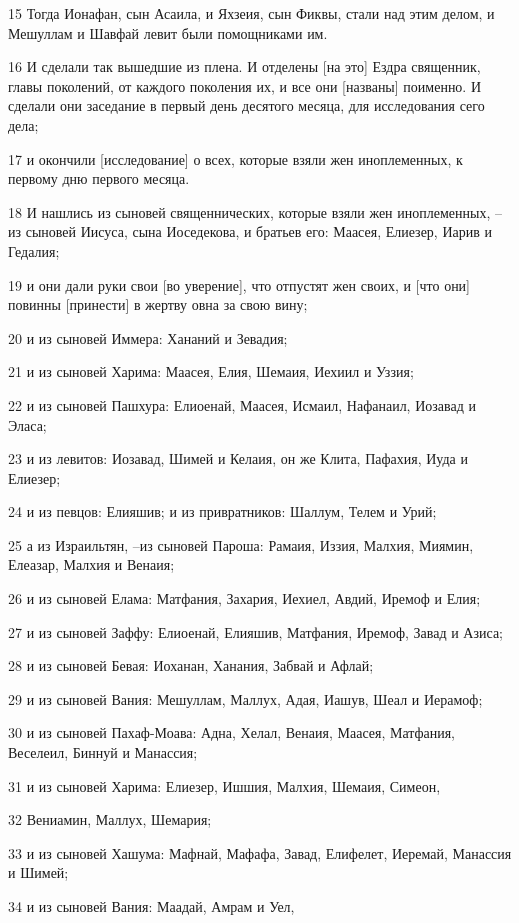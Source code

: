 \par 15 Тогда Ионафан, сын Асаила, и Яхзеия, сын Фиквы, стали над этим делом, и Мешуллам и Шавфай левит были помощниками им.
\par 16 И сделали так вышедшие из плена. И отделены [на это] Ездра священник, главы поколений, от каждого поколения их, и все они [названы] поименно. И сделали они заседание в первый день десятого месяца, для исследования сего дела;
\par 17 и окончили [исследование] о всех, которые взяли жен иноплеменных, к первому дню первого месяца.
\par 18 И нашлись из сыновей священнических, которые взяли жен иноплеменных, --из сыновей Иисуса, сына Иоседекова, и братьев его: Маасея, Елиезер, Иарив и Гедалия;
\par 19 и они дали руки свои [во уверение], что отпустят жен своих, и [что они] повинны [принести] в жертву овна за свою вину;
\par 20 и из сыновей Иммера: Хананий и Зевадия;
\par 21 и из сыновей Харима: Маасея, Елия, Шемаия, Иехиил и Уззия;
\par 22 и из сыновей Пашхура: Елиоенай, Маасея, Исмаил, Нафанаил, Иозавад и Эласа;
\par 23 и из левитов: Иозавад, Шимей и Келаия, он же Клита, Пафахия, Иуда и Елиезер;
\par 24 и из певцов: Елияшив; и из привратников: Шаллум, Телем и Урий;
\par 25 а из Израильтян, --из сыновей Пароша: Рамаия, Иззия, Малхия, Миямин, Елеазар, Малхия и Венаия;
\par 26 и из сыновей Елама: Матфания, Захария, Иехиел, Авдий, Иремоф и Елия;
\par 27 и из сыновей Заффу: Елиоенай, Елияшив, Матфания, Иремоф, Завад и Азиса;
\par 28 и из сыновей Бевая: Иоханан, Ханания, Забвай и Афлай;
\par 29 и из сыновей Вания: Мешуллам, Маллух, Адая, Иашув, Шеал и Иерамоф;
\par 30 и из сыновей Пахаф-Моава: Адна, Хелал, Венаия, Маасея, Матфания, Веселеил, Биннуй и Манассия;
\par 31 и из сыновей Харима: Елиезер, Ишшия, Малхия, Шемаия, Симеон,
\par 32 Вениамин, Маллух, Шемария;
\par 33 и из сыновей Хашума: Мафнай, Мафафа, Завад, Елифелет, Иеремай, Манассия и Шимей;
\par 34 и из сыновей Вания: Маадай, Амрам и Уел,
